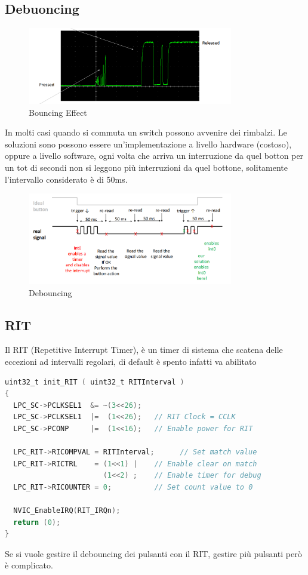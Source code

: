\documentclass[12pt]{article}
\begin{document}
\subsection{Debuoncing}
\begin{figure}[H]
    \centering
    \includegraphics[width=0.8\textwidth]{bouncing-effect.png}
    \caption{Bouncing Effect}
    \label{fig:bouncing-effect}
\end{figure}
In molti casi quando si commuta un switch possono avvenire dei rimbalzi. Le soluzioni sono possono essere un'implementazione a livello hardware (costoso), oppure a livello software, ogni volta che arriva un interruzione da quel botton per un tot di secondi non si leggono pi\`u interruzioni da quel bottone, solitamente l'intervallo considerato \`e di 50ms.
\begin{figure}[H]
    \centering
    \includegraphics[width=0.8\textwidth]{debouncing.png}
    \caption{Debouncing}
    \label{fig:debouncing}
\end{figure}


\subsection{RIT}
Il RIT (Repetitive Interrupt Timer), \`e un timer di sistema che scatena delle eccezioni ad intervalli regolari, di default \`e spento infatti va abilitato
\begin{lstlisting}[language=C]
uint32_t init_RIT ( uint32_t RITInterval )
{
  LPC_SC->PCLKSEL1  &= ~(3<<26);
  LPC_SC->PCLKSEL1  |=  (1<<26);   // RIT Clock = CCLK
  LPC_SC->PCONP     |=  (1<<16);   // Enable power for RIT

  LPC_RIT->RICOMPVAL = RITInterval;      // Set match value
  LPC_RIT->RICTRL    = (1<<1) |    // Enable clear on match
					   (1<<2) ;	   // Enable timer for debug
  LPC_RIT->RICOUNTER = 0;          // Set count value to 0

  NVIC_EnableIRQ(RIT_IRQn);
  return (0);
}
\end{lstlisting}
Se si vuole gestire il debouncing dei pulsanti con il RIT, gestire pi\`u pulsanti per\`o \`e complicato.
\end{document}
